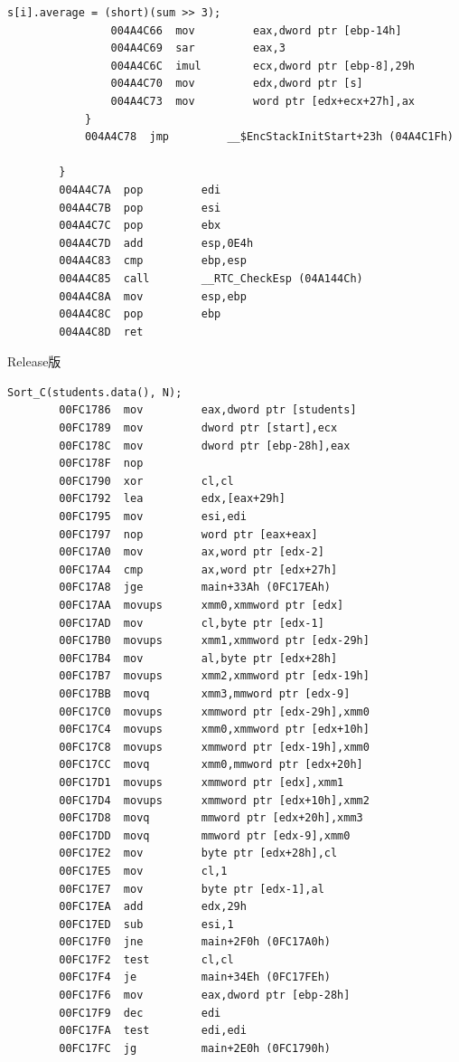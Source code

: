 \documentclass[supercite]{Experimental_Report}
\theoremstyle{definition}
\begin{document}
\begin{lstlisting}[style=commonCodeStyle, caption={debug.asm}, label={lst:2-5}]
				s[i].average = (short)(sum >> 3);
				004A4C66  mov         eax,dword ptr [ebp-14h]  
				004A4C69  sar         eax,3  
				004A4C6C  imul        ecx,dword ptr [ebp-8],29h  
				004A4C70  mov         edx,dword ptr [s]  
				004A4C73  mov         word ptr [edx+ecx+27h],ax  
			}
			004A4C78  jmp         __$EncStackInitStart+23h (04A4C1Fh)  
			
		}
		004A4C7A  pop         edi  
		004A4C7B  pop         esi  
		004A4C7C  pop         ebx  
		004A4C7D  add         esp,0E4h  
		004A4C83  cmp         ebp,esp  
		004A4C85  call        __RTC_CheckEsp (04A144Ch)  
		004A4C8A  mov         esp,ebp  
		004A4C8C  pop         ebp  
		004A4C8D  ret  
	\end{lstlisting}
	Release版
	\begin{lstlisting}[style=commonCodeStyle, caption={Release.asm}, label={lst:2-6}]
		Sort_C(students.data(), N);
		00FC1786  mov         eax,dword ptr [students]  
		00FC1789  mov         dword ptr [start],ecx  
		00FC178C  mov         dword ptr [ebp-28h],eax  
		00FC178F  nop  
		00FC1790  xor         cl,cl  
		00FC1792  lea         edx,[eax+29h]  
		00FC1795  mov         esi,edi  
		00FC1797  nop         word ptr [eax+eax]  
		00FC17A0  mov         ax,word ptr [edx-2]  
		00FC17A4  cmp         ax,word ptr [edx+27h]  
		00FC17A8  jge         main+33Ah (0FC17EAh)  
		00FC17AA  movups      xmm0,xmmword ptr [edx]  
		00FC17AD  mov         cl,byte ptr [edx-1]  
		00FC17B0  movups      xmm1,xmmword ptr [edx-29h]  
		00FC17B4  mov         al,byte ptr [edx+28h]  
		00FC17B7  movups      xmm2,xmmword ptr [edx-19h]  
		00FC17BB  movq        xmm3,mmword ptr [edx-9]  
		00FC17C0  movups      xmmword ptr [edx-29h],xmm0  
		00FC17C4  movups      xmm0,xmmword ptr [edx+10h]  
		00FC17C8  movups      xmmword ptr [edx-19h],xmm0  
		00FC17CC  movq        xmm0,mmword ptr [edx+20h]  
		00FC17D1  movups      xmmword ptr [edx],xmm1  
		00FC17D4  movups      xmmword ptr [edx+10h],xmm2  
		00FC17D8  movq        mmword ptr [edx+20h],xmm3  
		00FC17DD  movq        mmword ptr [edx-9],xmm0  
		00FC17E2  mov         byte ptr [edx+28h],cl  
		00FC17E5  mov         cl,1  
		00FC17E7  mov         byte ptr [edx-1],al  
		00FC17EA  add         edx,29h  
		00FC17ED  sub         esi,1  
		00FC17F0  jne         main+2F0h (0FC17A0h)  
		00FC17F2  test        cl,cl  
		00FC17F4  je          main+34Eh (0FC17FEh)  
		00FC17F6  mov         eax,dword ptr [ebp-28h]  
		00FC17F9  dec         edi  
		00FC17FA  test        edi,edi  
		00FC17FC  jg          main+2E0h (0FC1790h)  
	\end{lstlisting}
	
\end{document}

